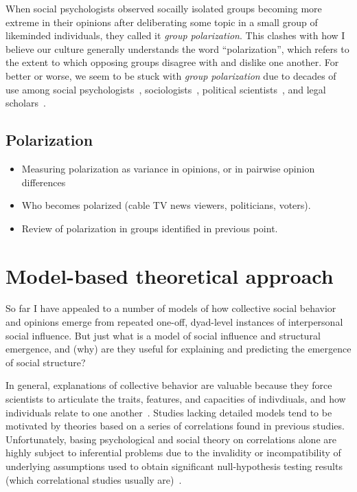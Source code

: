 \documentclass[12pt,letterpaper]{article}
\begin{document}
When social psychologists observed socailly isolated groups becoming more extreme
in their opinions after deliberating some topic in a small group of likeminded
individuals, they called it \emph{group polarization}. 
This clashes with how I believe our culture generally understands the word
``polarization'', which refers to the extent to which opposing groups disagree with
and dislike one another. For better or worse, we seem to be stuck with 
\emph{group polarization} due to decades of 
use among social psychologists~\cite{Brown1986,Sieber2019},
sociologists~\cite{Friedkin1999a}, political scientists~\cite{Schkade2010}, and legal scholars~\cite{Sunstein2002}.

\subsection{Polarization}

\begin{itemize}
  \item
    Measuring polarization as variance in opinions, or in pairwise opinion differences
  \item 
    Who becomes polarized (cable TV news viewers, politicians, voters).
  \item
    Review of polarization in groups identified in previous point.
\end{itemize}

\section{Model-based theoretical approach}

So far I have appealed to a number of models of how collective social 
behavior and opinions emerge from repeated one-off, 
dyad-level instances of interpersonal social influence. But just what is
a model of social influence and structural emergence, 
and (why) are they useful for explaining and predicting the
emergence of social structure? 

In general, explanations of collective behavior are valuable because they force
scientists to articulate the traits, features, and capacities of indivdiuals,
and how individuals relate to one another~\cite{Kauffman1970,Wimsatt2013}.
Studies lacking detailed models tend to be motivated by theories based on
a series of correlations found in previous studies. Unfortunately, basing
psychological and social theory on correlations alone are highly subject
to inferential problems due to the invalidity or incompatibility of 
underlying assumptions used to obtain significant null-hypothesis testing
results (which correlational studies usually are)~\cite{Meehl1990}.
\end{document}
